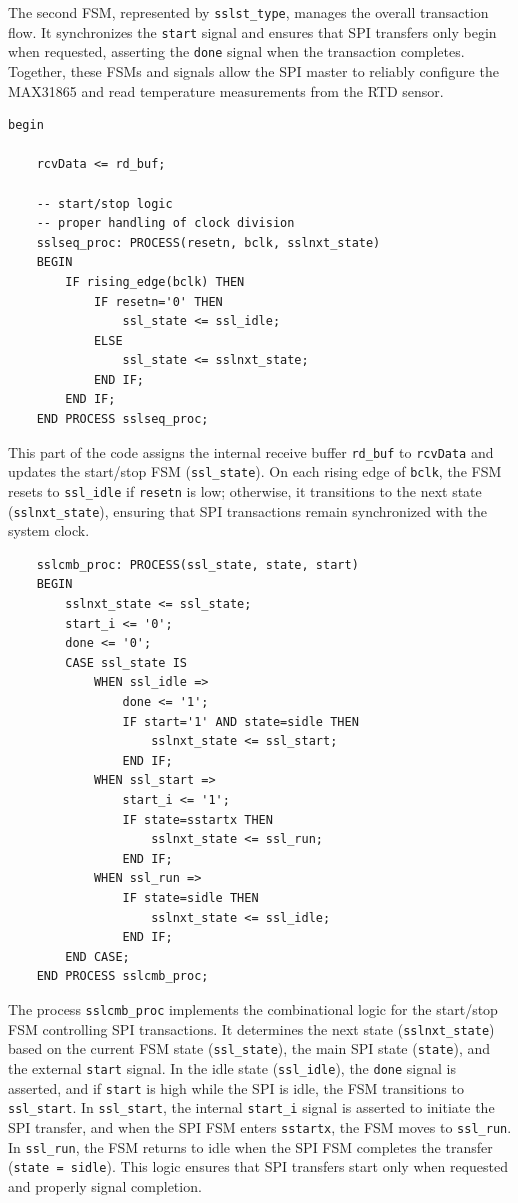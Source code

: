 The second FSM, represented by \texttt{sslst\_type}, manages the overall transaction flow. It synchronizes the \texttt{start} signal and ensures that SPI transfers only begin when requested, asserting the \texttt{done} signal when the transaction completes. Together, these FSMs and signals allow the SPI master to reliably configure the MAX31865 and read temperature measurements from the RTD sensor.

\begin{verbatim}
begin

	rcvData <= rd_buf;

	-- start/stop logic
	-- proper handling of clock division
	sslseq_proc: PROCESS(resetn, bclk, sslnxt_state)
	BEGIN
		IF rising_edge(bclk) THEN
			IF resetn='0' THEN
				ssl_state <= ssl_idle;
			ELSE
				ssl_state <= sslnxt_state;
			END IF;
		END IF;
	END PROCESS sslseq_proc;
\end{verbatim}
This part of the code assigns the internal receive buffer \texttt{rd\_buf} to \texttt{rcvData} and updates the start/stop FSM (\texttt{ssl\_state}). On each rising edge of \texttt{bclk}, the FSM resets to \texttt{ssl\_idle} if \texttt{resetn} is low; otherwise, it transitions to the next state (\texttt{sslnxt\_state}), ensuring that SPI transactions remain synchronized with the system clock.

\begin{verbatim}
	sslcmb_proc: PROCESS(ssl_state, state, start)
	BEGIN
		sslnxt_state <= ssl_state;
		start_i <= '0';
		done <= '0';
		CASE ssl_state IS
			WHEN ssl_idle =>
				done <= '1';
				IF start='1' AND state=sidle THEN
					sslnxt_state <= ssl_start;
				END IF;
			WHEN ssl_start =>
				start_i <= '1';
				IF state=sstartx THEN
					sslnxt_state <= ssl_run;
				END IF;
			WHEN ssl_run =>
				IF state=sidle THEN
					sslnxt_state <= ssl_idle;
				END IF;
		END CASE;
	END PROCESS sslcmb_proc;
\end{verbatim}
The process \texttt{sslcmb\_proc} implements the combinational logic for the start/stop FSM controlling SPI transactions. It determines the next state (\texttt{sslnxt\_state}) based on the current FSM state (\texttt{ssl\_state}), the main SPI state (\texttt{state}), and the external \texttt{start} signal. In the idle state (\texttt{ssl\_idle}), the \texttt{done} signal is asserted, and if \texttt{start} is high while the SPI is idle, the FSM transitions to \texttt{ssl\_start}. In \texttt{ssl\_start}, the internal \texttt{start\_i} signal is asserted to initiate the SPI transfer, and when the SPI FSM enters \texttt{sstartx}, the FSM moves to \texttt{ssl\_run}. In \texttt{ssl\_run}, the FSM returns to idle when the SPI FSM completes the transfer (\texttt{state = sidle}). This logic ensures that SPI transfers start only when requested and properly signal completion.

